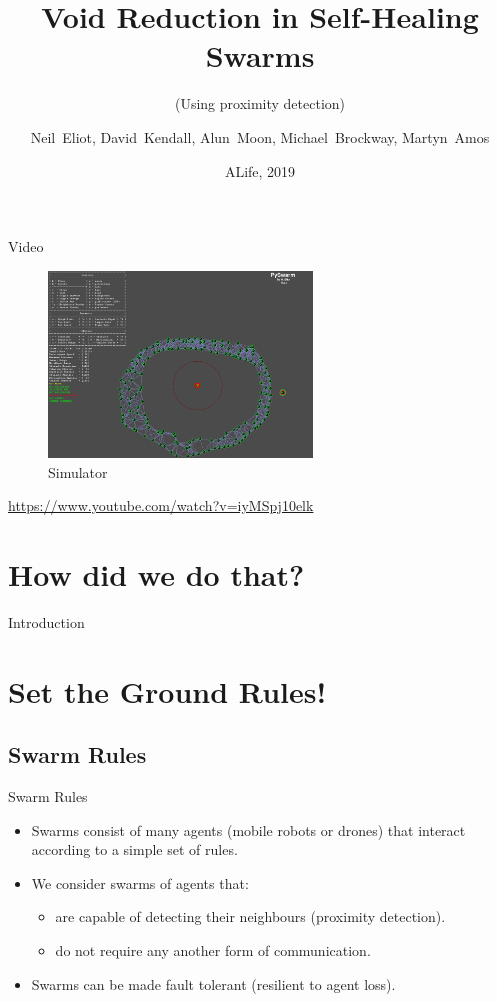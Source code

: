 \documentclass{beamer}
\title{Void Reduction in Self-Healing Swarms}
\subtitle{(Using proximity detection)}
\author{Neil~Eliot\inst{1}, David~Kendall\inst{1}, Alun~Moon\inst{1}, Michael~Brockway\inst{1}, Martyn~Amos\inst{1}}
\institute[Northumbria University] %
{
  \inst{1}
  Department of Computer and Information Sciences\\
  University of Northumbria
}
\date{ALife, 2019}
\begin{document}
\begin{frame}
  \titlepage
\end{frame}

\begin{frame}{Video}
  \begin{center}
    \begin{figure}
      \begin{center}
        \includegraphics[width=7cm]{Simulator.pdf}
      \end{center}
      \caption{Simulator}
    \end{figure}
    \href{https://www.youtube.com/watch?v=iyMSpj10elk}{https://www.youtube.com/watch?v=iyMSpj10elk}
  \end{center}
\end{frame}  
\section{How did we do that?
}
\begin{frame}{Introduction}
  \tableofcontents
\end{frame}


\section{Set the Ground Rules!}
\subsection{Swarm Rules}

\begin{frame}{Swarm Rules}
  \begin{itemize}
  \item {
    Swarms consist of many agents (mobile robots or drones) that interact according to a simple set of rules.
  }
  \item {
    We consider swarms of agents that:
    \begin{itemize}
      \item are capable of detecting their neighbours (proximity detection). 
      \item do not require any another form of communication. 
    \end{itemize}
  }
  \item {
    Swarms can be made fault tolerant (resilient to agent loss).
  }
  \end{itemize}
\end{frame}
\end{document}
